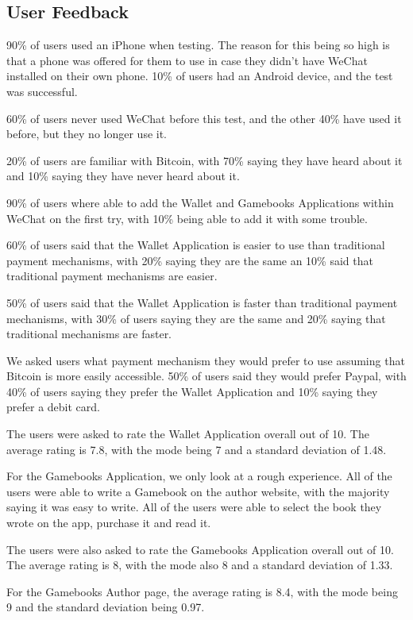 \subsection{User Feedback}

90\% of users used an iPhone when testing. The reason for this being so high is that a phone was offered for them to use in case they didn't have WeChat installed on their own phone. 10\% of users had an Android device, and the test was successful.

60\% of users never used WeChat before this test, and the other 40\% have used it before, but they no longer use it.

20\% of users are familiar with Bitcoin, with 70\% saying they have heard about it and 10\% saying they have never heard about it. 

90\% of users where able to add the Wallet and Gamebooks Applications within WeChat on the first try, with 10\% being able to add it with some trouble.

60\% of users said that the Wallet Application is easier to use than traditional payment mechanisms, with 20\% saying they are the same an 10\% said that traditional payment mechanisms are easier.

50\% of users said that the Wallet Application is faster than traditional payment mechanisms, with 30\% of users saying they are the same and 20\% saying that traditional mechanisms are faster.

We asked users what payment mechanism they would prefer to use assuming that Bitcoin is more easily accessible. 50\% of users said they would prefer Paypal, with 40\% of users saying they prefer the Wallet Application and 10\% saying they prefer a debit card.

The users were asked to rate the Wallet Application overall out of 10. The average rating is 7.8, with the mode being 7 and a standard deviation of 1.48.

For the Gamebooks Application, we only look at a rough experience. All of the users were able to write a Gamebook on the author website, with the majority saying it was easy to write. All of the users were able to select the book they wrote on the app, purchase it and read it.

The users were also asked to rate the Gamebooks Application overall out of 10. The average rating is 8, with the mode also 8 and a standard deviation of 1.33.

For the Gamebooks Author page, the average rating is 8.4, with the mode being 9 and the standard deviation being 0.97.



